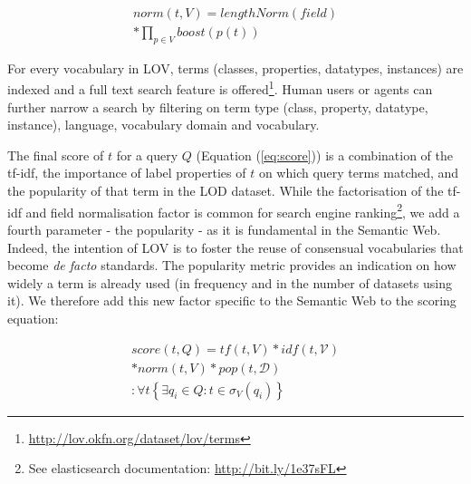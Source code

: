 \documentclass{iosart2c}
\begin{document}
\begin{equation}\label{eq:norm}
\begin{split}
norm(t,V) =  lengthNorm(field) \\
* \prod_{p \in V} boost(p(t))
\end{split}
\end{equation}

For every vocabulary in LOV, terms (classes, properties, datatypes, instances) are indexed and a full text search feature is offered\footnote{\url{http://lov.okfn.org/dataset/lov/terms}}. Human users or agents can further narrow a search by filtering on term type (class, property, datatype, instance), language, vocabulary domain and vocabulary.

The final score of $t$ for a query $Q$ (Equation (\ref{eq:score})) is a combination of the tf-idf, the importance of label properties of $t$ on which query terms matched, and the popularity of that term in the LOD dataset.  While the factorisation of the tf-idf and field normalisation factor is common for search engine ranking\footnote{See elasticsearch documentation: \url{http://bit.ly/1e37sFL}}, we add a fourth parameter - the popularity - as it is fundamental in the Semantic Web. Indeed, the intention of LOV is to foster the reuse of consensual vocabularies that become \textit{de facto} standards. The popularity metric provides an indication on how widely a term is already used (in frequency and in the number of datasets using it). We therefore add this new factor specific to the Semantic Web to the scoring equation:
 

\begin{equation}\label{eq:score}
\begin{split}
score(t,Q) =tf(t,V) * idf(t,\mathcal{V}) \\
* norm(t,V) * pop(t,\mathcal{D})\\
: \forall t\left\{\exists q_i \in Q: t \in \sigma_V(q_i)\right\}
\end{split}
\end{equation}
\end{document}
